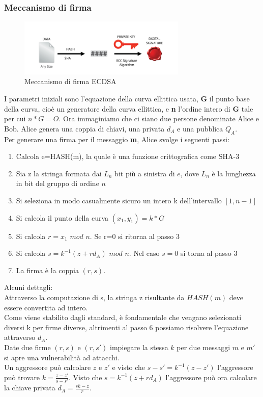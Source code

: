 \documentclass[a4paper,11pt]{report}
\begin{document}
\subsubsection{Meccanismo di firma}
\begin{figure}[htbp] 
\begin{center}
\includegraphics[width=8cm]{img/s.png} 
\end{center}
\caption{Meccanismo di firma ECDSA \cite{SHA}}
\end{figure}
I parametri iniziali sono l'equazione della curva ellittica usata, \textbf{G} il punto base della curva, cioè un generatore della curva ellittica, e \textbf{n} l'ordine intero di \textbf{G} tale per cui $n*G=O$. Ora immaginiamo che ci siano due persone denominate Alice e Bob.  Alice genera una coppia di chiavi, una privata \textbf{$d_{A}$} e una pubblica \textbf{$Q_{A}$}.\\ Per generare una firma per il messaggio \textbf{m}, Alice svolge i seguenti passi:
\begin{enumerate}
\item Calcola e=HASH(m), la quale è una funzione crittografica come SHA-3
\item Sia z la stringa formata dai $L_{n}$ bit più a sinistra di $e$, dove $L_{n}$ è la lunghezza in bit del gruppo di ordine $n$
\item Si seleziona in modo casualmente sicuro un intero k dell'intervallo $[1,n-1]$
\item Si calcola il punto della curva $(x_{1},y_{1}) = k*G$
\item Si calcola $r=x_{1}$ $mod$ $n$. Se r=0 si ritorna al passo 3
\item Si calcola $s=k^{-1}(z+rd_{A})$ $mod$ $n$. Nel caso $s=0$ si torna al passo 3
\item La firma è la coppia $(r,s)$. 
\end{enumerate}

Alcuni dettagli:\\
Attraverso la computazione di s, la stringa z risultante da $HASH(m)$ deve essere convertita ad intero.\\
Come viene stabilito dagli standard, è fondamentale che vengano selezionati diversi k per firme diverse, altrimenti al passo 6 possiamo risolvere l'equazione attraverso $d_{A}$.\\
Date due firme $(r,s)$ e $(r,s')$ impiegare la stessa $k$ per due messaggi $m$ e $m'$ si apre una vulnerabilità ad attacchi.\\
Un aggressore può calcolare $z$ e $z'$ e visto che $s-s'=k^{-1}(z-z')$ l'aggressore può trovare $k=\frac{z-z'}{s-s'}$. Visto che $s=k^{-1}(z+rd_{A})$ l'aggressore può ora calcolare la chiave privata $d_{A}=\frac{sk-z}{r}$.
\end{document}
